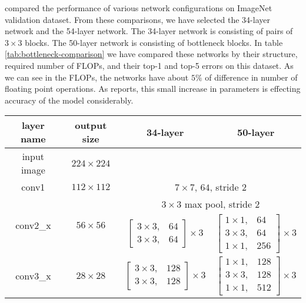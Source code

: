 \cite{He:2015aa} compared the performance of various network configurations on ImageNet validation dataset. From these comparisons, we have selected the 34-layer network and the 54-layer network. The 34-layer network is consisting of pairs of $3 \times 3$ blocks. The 50-layer network is consisting of bottleneck blocks. In table \ref{tab:bottleneck-comparison} we have compared these networks by their structure, required number of FLOPs, and their top-1 and top-5 errors on this dataset. As we can see in the FLOPs, the networks have about $5\%$ of difference in number of floating point operations. As \cite{He:2015aa} reports, this small increase in parameters is effecting accuracy of the model considerably. 

\begin{table}[]
\centering
\begin{tabular}{ | c | c | c | c | }
\hline
layer name			& output size 					& 34-layer																& 50-layer																			\\ \hline
input image			& $224 \times 224$				& \multicolumn{2}{c|}{}																																	\\ \hline
conv1				& $112 \times112$				& \multicolumn{2}{c|}{$ 7 \times 7$, $64$, stride $2$}																												\\ \hline
\multirow{2}{*}{conv2\_x}	& \multirow{2}{*}{$56 \times 56$} 	& \multicolumn{2}{c|}{$3 \times 3$ max pool, stride $2$}																											\\ \cline{3-4} 
					&							& $\begin{bmatrix} 3 \times 3, &   64 \\ 3 \times 3, &   64 \end{bmatrix} \times 3 $		& $\begin{bmatrix}1 \times 1, & 64 \\ 3 \times 3, & 64 \\ 1 \times 1, & 256 \end{bmatrix}^{} \times 3 $ 		\\ \hline
conv3\_x				& $28 \times 28$				& $\begin{bmatrix} 3 \times 3, & 128 \\ 3 \times 3, & 128 \end{bmatrix} \times 3 $		& $\begin{bmatrix}1 \times 1, & 128 \\ 3 \times 3, & 128 \\ 1 \times 1, & 512 \end{bmatrix} \times 3$		\\ \hline

\end{tabular}
\end{table}
